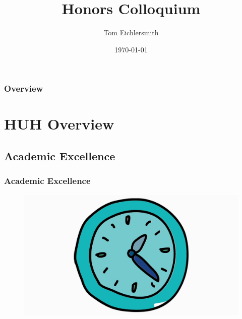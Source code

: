 \documentclass{beamer}
\title[HUH Colloquium]{Honors Colloquium} %
\author{Tom Eichlersmith}
\institute[Hamline U]
{
Hamline University \\
\medskip
\texttt{teichlersmith01@hamline.edu}
}
\date{\today}
\begin{document}
\begin{frame}
\titlepage %
\end{frame}

\begin{frame}
\frametitle{Overview} %
\tableofcontents %
\end{frame}


\section{HUH Overview} 

\subsection{Academic Excellence} %

\begin{frame}
	
\frametitle{Academic Excellence}

\begin{figure}[h]
	\includegraphics[width=0.8\linewidth]{images/clock.png}
\end{figure}

\end{frame}
\end{document}
